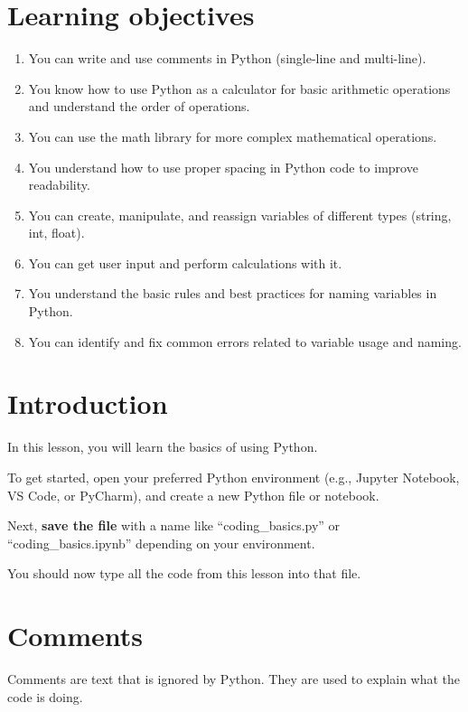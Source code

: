 \documentclass[
  letterpaper,
  DIV=11,
  numbers=noendperiod]{scrreprt}
\providecommand{\tightlist}{%
  \setlength{\itemsep}{0pt}\setlength{\parskip}{0pt}}\usepackage{longtable,booktabs,array}
\begin{document}
\section{Learning objectives}\label{learning-objectives-1}

\begin{enumerate}
\def\labelenumi{\arabic{enumi}.}
\tightlist
\item
  You can write and use comments in Python (single-line and multi-line).
\item
  You know how to use Python as a calculator for basic arithmetic
  operations and understand the order of operations.
\item
  You can use the math library for more complex mathematical operations.
\item
  You understand how to use proper spacing in Python code to improve
  readability.
\item
  You can create, manipulate, and reassign variables of different types
  (string, int, float).
\item
  You can get user input and perform calculations with it.
\item
  You understand the basic rules and best practices for naming variables
  in Python.
\item
  You can identify and fix common errors related to variable usage and
  naming.
\end{enumerate}

\section{Introduction}\label{introduction-2}

In this lesson, you will learn the basics of using Python.

To get started, open your preferred Python environment (e.g., Jupyter
Notebook, VS Code, or PyCharm), and create a new Python file or
notebook.

Next, \textbf{save the file} with a name like ``coding\_basics.py'' or
``coding\_basics.ipynb'' depending on your environment.

You should now type all the code from this lesson into that file.

\section{Comments}\label{comments}

Comments are text that is ignored by Python. They are used to explain
what the code is doing.
\end{document}
